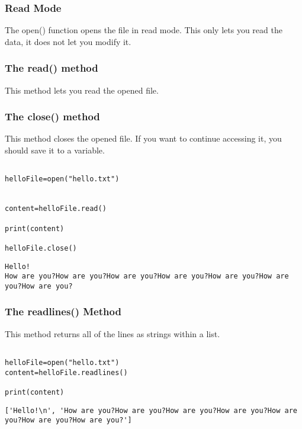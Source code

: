 \documentclass[11pt]{article}
\begin{document}
\subsubsection{Read Mode}
\label{sec:orgfecdd7b}

The open() function opens the file in read mode. This only lets you read the data, it does not let you modify it.

\subsubsection{The read() method}
\label{sec:orgfe24515}

This method lets you read the opened file.

\subsubsection{The close() method}
\label{sec:orgf52691f}

This method closes the opened file. If you want to continue accessing it, you should save it to a variable.

\begin{verbatim}

helloFile=open("hello.txt")


content=helloFile.read()

print(content)

helloFile.close()

\end{verbatim}

\begin{verbatim}
Hello!
How are you?How are you?How are you?How are you?How are you?How are you?How are you?
\end{verbatim}

\subsubsection{The readlines() Method}
\label{sec:orgb74e124}

This method returns all of the lines as strings within a list.

\begin{verbatim}

helloFile=open("hello.txt")
content=helloFile.readlines()

print(content)

\end{verbatim}

\begin{verbatim}
['Hello!\n', 'How are you?How are you?How are you?How are you?How are you?How are you?How are you?']
\end{verbatim}
\end{document}

